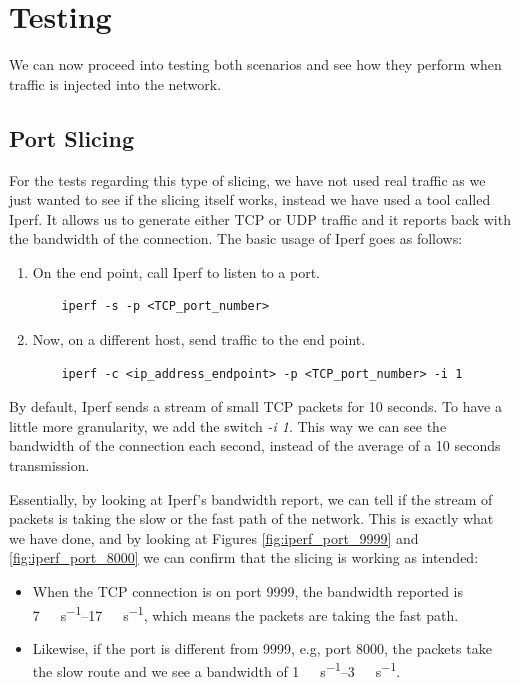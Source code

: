 \chapter{Testing}


We can now proceed into testing both scenarios and see how they perform when traffic is injected into the network. 

\section{Port Slicing}
For the tests regarding this type of slicing, we have not used real traffic as we just wanted to see if the slicing itself works, instead we have used a tool called Iperf. It allows us to generate either TCP or UDP traffic and it reports back with the bandwidth of the connection. The basic usage of Iperf goes as follows:
\begin{enumerate}
    \item On the end point, call Iperf to listen to a port.
    \begin{lstlisting}
    iperf -s -p <TCP_port_number>
    \end{lstlisting}
    
    \item Now, on a different host, send traffic to the end point.
    \begin{lstlisting}
    iperf -c <ip_address_endpoint> -p <TCP_port_number> -i 1
    \end{lstlisting}
\end{enumerate}

By default, Iperf sends a stream of small TCP packets for 10 seconds. To have a little more granularity, we add the switch \textit{-i 1}. This way we can see the bandwidth of the connection each second, instead of the average of a 10 seconds transmission.

Essentially, by looking at Iperf's bandwidth report, we can tell if the stream of packets is taking the slow or the fast path of the network. This is exactly what we have done, and by looking at Figures \ref{fig:iperf_port_9999} and \ref{fig:iperf_port_8000} we can confirm that the slicing is working as intended:
\begin{itemize}
    \item When the TCP connection is on port 9999, the bandwidth reported is \SIrange[per-mode=symbol]{7}{17}{\mega\bit\per\second}, which means the packets are taking the fast path. 
    \item Likewise, if the port is different from 9999, e.g, port 8000, the packets take the slow route and we see a bandwidth of \SIrange[per-mode=symbol]{1}{3}{\mega\bit\per\second}.
\end{itemize}

